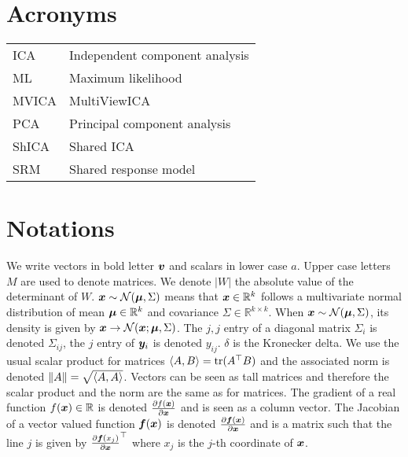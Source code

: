    \chapter*{Acronyms}
    \begin{tabular}{ll}
        ICA & Independent component analysis \\
        ML & Maximum likelihood \\
      MVICA & MultiViewICA \\
      PCA & Principal component analysis \\
      ShICA & Shared ICA \\
      SRM & Shared response model \\

    \end{tabular}

    \chapter*{Notations}
    We write vectors in bold letter $\boldsymbol{v}$ and scalars in lower case $a$. Upper case letters $M$ are used to denote
    matrices. We denote $|W|$ the absolute value of the determinant of $W$. $\boldsymbol{x} \sim \mathcal{N}(\boldsymbol{\mu}, \Sigma)$ means that $\boldsymbol{x} \in \mathbb{R}^k$ follows a multivariate normal distribution of mean $\boldsymbol{\mu} \in \mathbb{R}^k$ and
    covariance $\Sigma \in \mathbb{R}^{k \times k}$. When $\boldsymbol{x} \sim \mathcal{N}(\boldsymbol{\mu},
    \Sigma)$, its density is given by $\boldsymbol{x} \rightarrow \mathcal{N}(\boldsymbol{x}; \boldsymbol{\mu}, \Sigma)$. The $j, j$ entry of a diagonal matrix $\Sigma_i$ is denoted $\Sigma_{ij}$, the $j$ entry of $\boldsymbol{y}_i$ is denoted $y_{ij}$. $\delta$ is the Kronecker delta.
    We use the usual scalar product for matrices $\langle{ A },{ B}\rangle =
    \mathop{\mathrm{tr}}(A^{\top} B)$ and the associated norm is denoted $\|A\| = \sqrt{\langle{
        A},{ A }\rangle}$. Vectors can be seen as tall matrices and
    therefore the scalar product and the norm are the same as for matrices.
    The gradient of a real function $f(\boldsymbol{x}) \in \mathbb{R}$ is denoted $\frac{ \partial f(\boldsymbol{x})}{\partial \boldsymbol{x}}$
    and is seen as a column vector. The Jacobian of a vector valued
    function $\boldsymbol{f}(\boldsymbol{x})$ is denoted $\frac{ \partial \boldsymbol{f}(\boldsymbol{x})}{\partial \boldsymbol{x}}$ and is a matrix
    such that the line $j$ is given by $\frac{ \partial \boldsymbol{f}(x_j)}{\partial \boldsymbol{x}}^{\top}$ where $x_j$
    is the $j$-th coordinate of $\boldsymbol{x}$.
\endgroup
